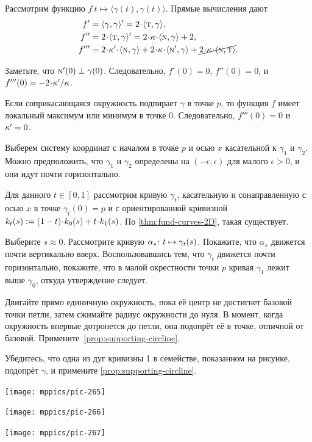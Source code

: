 \begin{multicols}{2}
Рассмотрим функцию $f\:t\mapsto \langle\gamma(t),\gamma(t)\rangle$.
Прямые вычисления дают 
\begin{align*}
f'
&=\langle\gamma,\gamma\rangle'
=2\cdot\langle\tan,\gamma\rangle,
\\
f''
&=2\cdot\langle\tan,\gamma\rangle'
=2\cdot\kur\cdot\langle\norm,\gamma\rangle+2,
\\
f'''
&=2\cdot\kur'\cdot\langle\norm,\gamma\rangle
+2\cdot\kur\cdot\langle\norm',\gamma\rangle+\cancel{2\cdot\kur\cdot\langle\norm,\tan\rangle}.
\end{align*}

Заметьте, что $\text{\sc{n}}'(0)\perp\gamma(0)$.
Следовательно, $f'(0)=0$, $f''(0)=0$, и $f'''(0)\z=-2\cdot\kur'/\kur$.

Если соприкасающаяся окружность подпирает $\gamma$ в точке $p$,
то функция $f$ имеет локальный максимум или минимум в точке $0$.
Следовательно, $f'''(0)=0$ и $\kappa'=0$.

Выберем систему координат с началом в точке $p$ и осью $x$ касательной к $\gamma_1$ и $\gamma_2$.
Можно предположить, что $\gamma_1$ и $\gamma_2$ определены на $(-\epsilon,\epsilon)$ для малого $\epsilon>0$,
и они идут почти горизонтально.

Для данного $t\in[0,1]$ рассмотрим кривую $\gamma_t$, касательную и сонаправленную с осью $x$ в точке $\gamma_t(0)=p$ и с ориентированной кривизной $\skur_t(s)\z\df(1\z-t)\cdot\skur_0(s)+t\cdot\skur_1(s)$.
По \ref{thm:fund-curves-2D}, такая существует.

Выберите $s\approx 0$.
Рассмотрите кривую $\alpha_s\:t\z\mapsto \gamma_t(s)$.
Покажите, что $\alpha_s$ движется почти вертикально вверх.
Воспользовавшись тем, что $\gamma_t$ движется почти горизонтально, покажите, что в малой окрестности точки $p$ кривая $\gamma_1$ лежит выше $\gamma_0$,
откуда утверждение следует.

Двигайте прямо единичную окружность, пока её центр не достигнет базовой точки петли, затем сжимайте радиус окружности до нуля.
В момент, когда окружность впервые дотронется до петли, она подопрёт её в точке, отличной от базовой.
Примените~\ref{prop:supporting-circline}.

Убедитесь, что одна из дуг кривизны 1 в семействе, показанном на рисунке, подопрёт $\gamma$, и примените \ref{prop:supporting-circline}.

\begin{Figure}
\begin{minipage}{.35\textwidth}
\centering
\texttt{[image: mppics/pic-265]}
\end{minipage}
\hfill
\begin{minipage}{.3\textwidth}
\centering
\texttt{[image: mppics/pic-266]}
\end{minipage}
\hfill
\begin{minipage}{.25\textwidth}
\centering
\texttt{[image: mppics/pic-267]}
\end{minipage}
\end{Figure}


\end{multicols}
